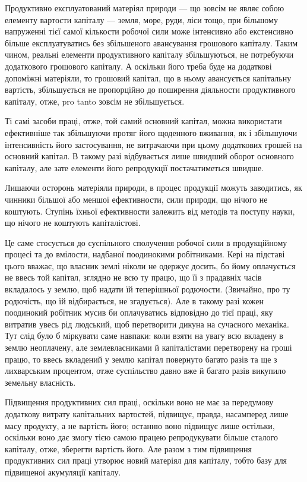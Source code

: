 Продуктивно експлуатований матеріял природи — що зовсім не являє
собою елементу вартости капіталу — земля, море, руди, ліси тощо, при
більшому напруженні тієї самої кількости робочої сили може інтенсивно
або екстенсивно більше експлуатуватись без збільшеного авансування грошового
капіталу. Таким чином, реальні елементи продуктивного капіталу
збільшуються, не потребуючи додаткового грошового капіталу. А оскільки
його треба буде на додаткові допоміжні матеріяли, то грошовий капітал,
що в ньому авансується капітальну вартість, збільшується не пропорційно
до поширення діяльности продуктивного капіталу, отже, pro
tanto зовсім не збільшується.

Ті самі засоби праці, отже, той самий основний капітал, можна використати
ефективніше так збільшуючи протяг його щоденного вживання,
як і збільшуючи інтенсивність його застосування, не витрачаючи
при цьому додаткових грошей на основний капітал. В такому разі відбувається
лише швидший оборот основного капіталу, але зате елементи
його репродукції постачатиметься швидше.

Лишаючи осторонь матеріяли природи, в процес продукції можуть
заводитись, як чинники більшої або меншої ефективности, сили
природи, що нічого не коштують. Ступінь їхньої ефективности
залежить від методів та поступу науки, що нічого не коштують капіталістові.

Це саме стосується до суспільного сполучення робочої сили в продукційному
процесі та до вмілости, надбаної поодинокими робітниками.
Кері на підставі цього вважає, що власник землі ніколи не одержує досить,
бо йому оплачується не ввесь той капітал, зглядно не всю ту
працю, що її з прадавніх часів вкладалось у землю, щоб надати їй теперішньої
родючости. (Звичайно, про ту родючість, що їй відбирається,
не згадується). Але в такому разі кожен поодинокий робітник мусив
би оплачуватись відповідно до тієї праці, яку витратив увесь рід людський,
щоб перетворити дикуна на сучасного механіка. Тут слід було б
міркувати саме навпаки: коли взяти на увагу всю вкладену в землю
неоплачену, але землевласниками й капіталістами перетворену на гроші
працю, то ввесь вкладений у землю капітал повернуто багато разів та
ще з лихварським процентом, отже суспільство давно вже й багато
разів викупило земельну власність.

Підвищення продуктивних сил праці, оскільки воно не має за передумову
додаткову витрату капітальних вартостей, підвищує, правда, насамперед
лише масу продукту, а не вартість його; останню воно підвищує
лише остільки, оскільки воно дає змогу тією самою працею репродукувати
більше сталого капіталу, отже, зберегти вартість його. Але разом з
тим підвищення продуктивних сил праці утворює новий матеріял для капіталу,
тобто базу для підвищеної акумуляції капіталу.


